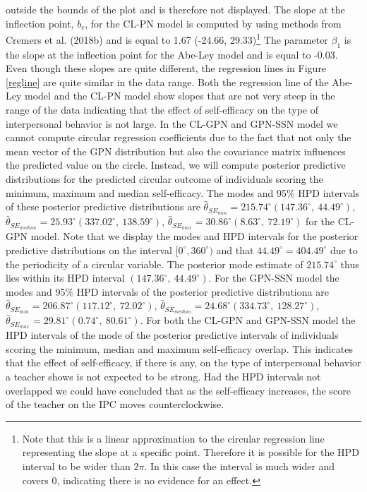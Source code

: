 \documentclass[man]{apa6}
\let\rmarkdownfootnote\footnote%
\def\footnote{\protect\rmarkdownfootnote}
\theoremstyle{definition}
\theoremstyle{definition}
\theoremstyle{definition}
\theoremstyle{remark}
\begin{document}
outside the bounds of the plot and is therefore not displayed. The slope
at the inflection point, \(b_c\), for the CL-PN model is computed by
using methods from Cremers et al. (2018b) and is equal to 1.67 (-24.66,
29.33)\footnote{Note that this is a linear approximation
to the circular regression line representing the slope at a specific point.
Therefore it is possible for the HPD interval to be wider than $2\pi$. In this
case the interval is much wider and covers 0, indicating there is no evidence
for an effect.} The parameter \(\beta_1\) is the slope at the inflection
point for the Abe-Ley model and is equal to -0.03. Even though these
slopes are quite different, the regression lines in Figure \ref{regline}
are quite similar in the data range. Both the regression line of the
Abe-Ley model and the CL-PN model show slopes that are not very steep in
the range of the data indicating that the effect of self-efficacy on the
type of interpersonal behavior is not large. \newline \indent In the
CL-GPN and GPN-SSN model we cannot compute circular regression
coefficients due to the fact that not only the mean vector of the GPN
distribution but also the covariance matrix influences the predicted
value on the circle. Instead, we will compute posterior predictive
distributions for the predicted circular outcome of individuals scoring
the minimum, maximum and median self-efficacy. The modes and 95\% HPD
intervals of these posterior predictive distributions are
\(\hat{\theta}_{SE_{min}} = 215.74^\circ (147.36^\circ, \: 44.49^\circ)\),
\(\hat{\theta}_{SE_{median}} = 25.93^\circ (337.02^\circ, \: 138.59^\circ)\),
\(\hat{\theta}_{SE_{max}} = 30.86^\circ (8.63^\circ, \: 72.19^\circ)\)
for the CL-GPN model. Note that we display the modes and HPD intervals
for the posterior predictive distributions on the interval
\([0^\circ, 360^\circ)\) and that \(44.49^\circ = 404.49^\circ\) due to
the periodicity of a circular variable. The posterior mode estimate of
\(215.74^\circ\) thus lies within its HPD interval
\((147.36^\circ, \: 44.49^\circ)\). For the GPN-SSN model the modes and
95\% HPD intervals of the posterior predictive distributiona are
\(\hat{\theta}_{SE_{min}} = 206.87^\circ (117.12^\circ, \: 72.02^\circ)\),
\(\hat{\theta}_{SE_{median}} = 24.68^\circ (334.73^\circ, \: 128.27^\circ)\),
\(\hat{\theta}_{SE_{max}} = 29.81^\circ (0.74^\circ, \: 80.61^\circ)\).
For both the CL-GPN and GPN-SSN model the HPD intervals of the mode of
the posterior predictive intervals of individuals scoring the minimum,
median and maximum self-efficacy overlap. This indicates that the effect
of self-efficacy, if there is any, on the type of interpersonal behavior
a teacher shows is not expected to be strong. Had the HPD intervals not
overlapped we could have concluded that as the self-efficacy increases,
the score of the teacher on the IPC moves counterclockwise.\newline
\end{document}
